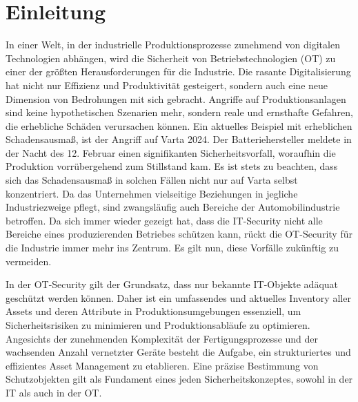\section{Einleitung}

In einer Welt, in der industrielle Produktionsprozesse zunehmend von digitalen Technologien abhängen, wird die Sicherheit von Betriebstechnologien (OT) zu einer der größten Herausforderungen für die Industrie. Die rasante Digitalisierung hat nicht nur Effizienz und Produktivität gesteigert, sondern auch eine neue Dimension von Bedrohungen mit sich gebracht. Angriffe auf Produktionsanlagen sind keine hypothetischen Szenarien mehr, sondern reale und ernsthafte Gefahren, die erhebliche Schäden verursachen können. Ein aktuelles Beispiel mit erheblichen Schadensausmaß, ist der Angriff auf Varta  2024. Der Batteriehersteller meldete in der Nacht des 12. Februar  einen signifikanten Sicherheitsvorfall, woraufhin die Produktion vorrübergehend zum Stillstand kam. Es ist stets zu beachten, dass sich das Schadensausmaß in solchen Fällen nicht nur auf Varta selbst konzentriert. Da das Unternehmen vielseitige Beziehungen in jegliche Industriezweige pflegt, sind zwangsläufig auch Bereiche der Automobilindustrie betroffen. Da sich immer wieder gezeigt hat, dass die IT-Security nicht alle Bereiche eines produzierenden Betriebes schützen kann, rückt die OT-Security für die Industrie immer mehr ins Zentrum. Es gilt nun, diese Vorfälle zukünftig zu vermeiden.

In der OT-Security gilt der Grundsatz, dass nur bekannte IT-Objekte adäquat geschützt werden können. Daher ist ein umfassendes und aktuelles Inventory aller Assets und deren Attribute in Produktionsumgebungen  essenziell, um Sicherheitsrisiken zu minimieren und Produktionsabläufe zu optimieren. Angesichts der zunehmenden Komplexität der Fertigungsprozesse und der wachsenden Anzahl vernetzter Geräte besteht die Aufgabe, ein strukturiertes und effizientes Asset Management zu etablieren. Eine präzise Bestimmung von Schutzobjekten gilt als Fundament eines jeden Sicherheitskonzeptes, sowohl in der IT als auch in der OT.

